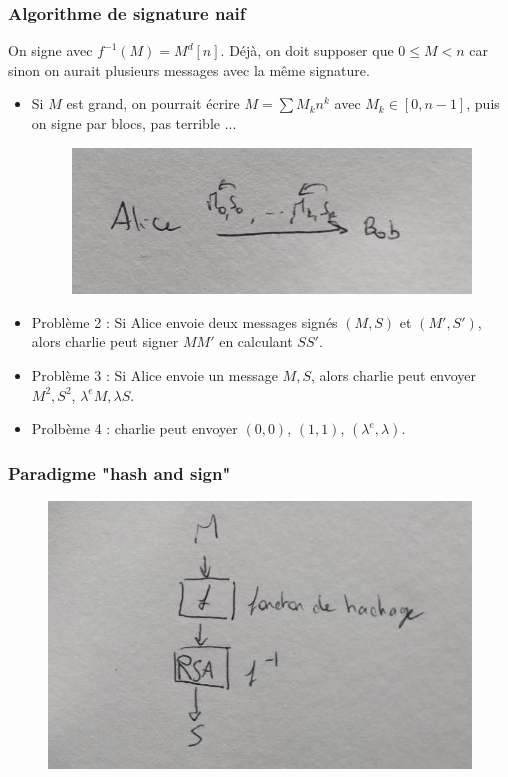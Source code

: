             \subsubsection{Algorithme de signature naif}
                On signe avec $f^{-1}(M) = M^d[n]$. Déjà, on doit supposer que $0 \leq M < n$ car sinon on aurait plusieurs messages avec la même signature.
                \begin{itemize}
                    \item Si $M$ est grand, on pourrait écrire $M = \sum M_kn^k$ avec $M_k \in [0, n-1]$, puis on signe par blocs, pas terrible ... 
                    \begin{figure}[H]
                        \centering
                        \includegraphics[width=.5\textwidth]{pictures/04}
                    \end{figure}
                    \item Problème 2 : Si Alice envoie deux messages signés $(M,S)$ et $(M',S')$, alors charlie peut signer $MM'$ en calculant $SS'$.
                    \item Problème 3 : Si Alice envoie un message $M,S$, alors charlie peut envoyer $M^2, S^2$, $\lambda^eM, \lambda S$.
                    \item Prolbème 4 : charlie peut envoyer $(0, 0)$, $(1, 1)$, $(\lambda^e, \lambda)$.
                \end{itemize}
                
            \subsubsection{Paradigme "hash and sign"}
                \begin{figure}[H]
                    \centering
                    \includegraphics[width=.5\textwidth]{pictures/05 }
                \end{figure}

